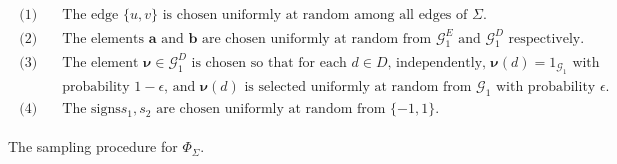\documentclass[a4paper,11pt]{article}
\theoremstyle{definition}
\newcommand{\tuple}[1]{{\mathbf{#1}}}
\newcommand{\gr}{\mathscr{G}}
\newcommand{\groupid}{1}
\begin{document}
\begin{figure}[ht]
    \centering
\begin{align*}
\boxed{
\begin{array}{llllll}
\mbox{($1$)}\quad & \text{The
edge $\{u,v\}$ is chosen uniformly at random among all edges of $\Sigma$.}
\\[0.5em]
%
\mbox{($2$)}\quad & 
\text{The elements $\tuple{a}$ and $\tuple{b}$ are chosen uniformly at random from $\gr_1^E$ and $\gr_1^D$ respectively.}
\\[0.5em]
%
\mbox{($3$)}\quad &
\text{The element $\bm{\nu}\in \gr_1^D$ is chosen so that for each $d\in D$, independently, 
$\bm{\nu}(d)=\groupid_{\gr_1}$ with} \\ & \text{probability $1-\epsilon$, and $\bm{\nu}(d)$ is selected uniformly at random from $\gr_1$  with probability $\epsilon$.}\\[0.5em]
%
\mbox{($4$)}\quad & \text{The signs
$s_1,s_2$ are chosen uniformly at random from $\{-1,1\}$.}
%
\end{array}
}
\end{align*}
 \caption{The sampling procedure for $\Phi_\Sigma$.}
 \label{fig:probs-reduction}
\end{figure}
\end{document}
